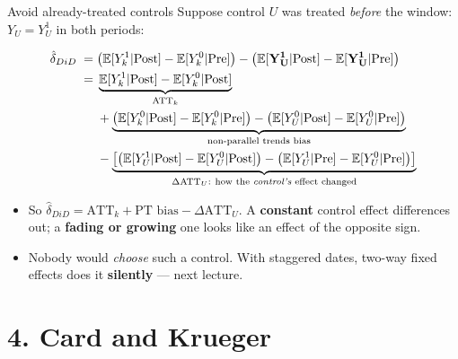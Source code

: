 \documentclass[
  11pt,
  ignorenonframetext,
  aspectratio=169,
]{beamer}
\providecommand{\tightlist}{%
  \setlength{\itemsep}{0pt}\setlength{\parskip}{0pt}}
\begin{document}
\begin{frame}{Avoid already-treated controls}
\protect{}\label{avoid-already-treated-controls}
Suppose control \(U\) was treated \emph{before} the window:
\(Y_U = Y^1_U\) in both periods:

\vspace{-0.5em}\small

\begin{align*}
\hat\delta_{DiD} \;=\;& \big(\mathbb{E}[Y^{1}_k|\text{Post}] - \mathbb{E}[Y^{0}_k|\text{Pre}]\big) - \big(\mathbb{E}[\mathbf{Y^{1}_U}|\text{Post}] - \mathbb{E}[\mathbf{Y^{1}_U}|\text{Pre}]\big) \\
=\;& \underbrace{\mathbb{E}[Y^1_k|\text{Post}] - \mathbb{E}[Y^0_k|\text{Post}]}_{\text{ATT}_k} \\
&+ \underbrace{\big(\mathbb{E}[Y^0_k|\text{Post}] - \mathbb{E}[Y^0_k|\text{Pre}]\big) - \big(\mathbb{E}[Y^0_U|\text{Post}] - \mathbb{E}[Y^0_U|\text{Pre}]\big)}_{\text{non-parallel trends bias}} \\
&- \underbrace{\big[\big(\mathbb{E}[Y^1_U|\text{Post}] - \mathbb{E}[Y^0_U|\text{Post}]\big) - \big(\mathbb{E}[Y^1_U|\text{Pre}] - \mathbb{E}[Y^0_U|\text{Pre}]\big)\big]}_{\Delta\text{ATT}_U:\ \text{how the \emph{control's} effect changed}}
\end{align*} \normalsize\vspace{-0.6em}

\begin{itemize}
\tightlist
\item
  So
  \(\hat\delta_{DiD} = \text{ATT}_k + \text{PT bias} - \Delta\text{ATT}_U\).
  A \textbf{constant} control effect differences out; a \textbf{fading
  or growing} one looks like an effect of the opposite sign.
\item
  Nobody would \emph{choose} such a control. With staggered dates,
  two-way fixed effects does it \textbf{silently} --- next lecture.
\end{itemize}
\end{frame}

\section{4. Card and Krueger}\label{card-and-krueger}
\end{document}
